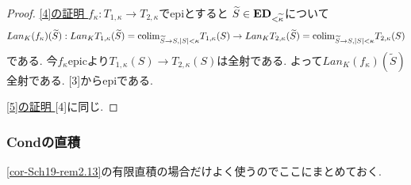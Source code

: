 \documentclass[dvipdfmx,a4paper,11pt]{report}
\newcommand{\colim}{{\rm colim}}
\theoremstyle{definition}
\begin{document}
\begin{proof}
 \underline{[4]の証明 }
 $f_{\kappa}: T_{1, \kappa} \to T_{2, \kappa}$でepiとすると
$\widetilde{S} \in {\bf ED}_{< \widetilde{\kappa}}$について
$$
Lan_{K}(f_{\kappa})(\widetilde{S}): 
Lan_{K}T_{1, \kappa} (\widetilde{S}) = \colim_{\widetilde{S} \to S, |S|<\kappa}T_{1, \kappa}(S)
\to 
Lan_{K}T_{2, \kappa}(\widetilde{S}) = \colim_{\widetilde{S} \to S, |S|<\kappa}T_{2, \kappa}(S)
$$
である.
今$f_{\kappa}$epicより$T_{1, \kappa}(S) \to T_{2, \kappa}(S)$は全射である.
よって$Lan_{K}(f_{\kappa})(\widetilde{S} )$全射である.
[3]からepiである.

 \underline{[5]の証明 } [4]に同じ. 
 \end{proof}

 \subsubsection{{\bf Cond}の直積}
  
\ref{cor-Sch19-rem2.13}の有限直積の場合だけよく使うのでここにまとめておく. 
\end{document}
